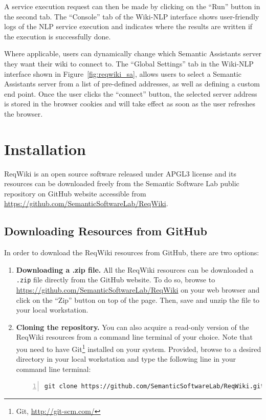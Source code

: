 \documentclass[10pt,twoside,openany,bibtotoc,liststotoc]{scrbook}
\newcommand{\blankline}{\vspace{5mm}}
\newcommand{\sa}{Semantic Assistants\xspace}
\begin{document}
A service execution request can then be made by clicking on the ``Run'' button in the second tab. The ``Console'' tab of the Wiki-NLP interface shows user-friendly logs of the NLP service execution and indicates where the results are written if the execution is successfully done.

Where applicable, users can dynamically change which \sa server they want their wiki to connect to. The ``Global Settings'' tab in the Wiki-NLP interface shown in Figure~\ref{fig:reqwiki_sa}, allows users to select a \sa server from a list of pre-defined addresses, as well as defining a custom end point. Once the user clicks the ``connect'' button, the selected server address is stored in the browser cookies and will take effect as soon as the user refreshes the browser.

\chapter{Installation}
\label{chap:install}
ReqWiki is an open source software released under APGL3 license and its resources can be downloaded freely from the Semantic Software Lab public repository on GitHub website accessible from \url{https://github.com/SemanticSoftwareLab/ReqWiki}.

\section{Downloading Resources from GitHub}
In order to download the ReqWiki resources from GitHub, there are two options:

\begin{enumerate}
\item \textbf{Downloading a .zip file. } All the ReqWiki resources can be downloaded a \texttt{.zip} file directly from the GitHub website. To do so, browse to \url{https://github.com/SemanticSoftwareLab/ReqWiki} on your web browser and click on the ``Zip'' button on top of the page. Then, save and unzip the file to your local workstation.
\item \textbf{Cloning the repository. } You can also acquire a read-only version of the ReqWiki resources from a command line terminal of your choice. Note that you need to have Git\footnote{Git, \url{http://git-scm.com/}} installed on your system. Provided, browse to a desired directory in your local workstation and type the following line in your command line terminal:
\blankline

\centering
\begin{lstlisting}[language=xml,numbers=left,xleftmargin=4mm,columns=flexible]
git clone https://github.com/SemanticSoftwareLab/ReqWiki.git
\end{lstlisting}
\end{enumerate}
\end{document}
